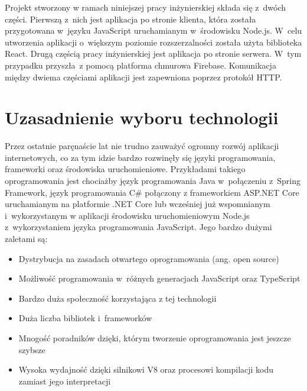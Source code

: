 \documentclass[../Kamil_Kowalewski_Main.tex]{subfiles}
\begin{document}
 {

    Projekt stworzony w ramach niniejszej pracy inżynierskiej składa się z~dwóch
    części. Pierwszą z~nich jest aplikacja po stronie klienta, która została
    przygotowana w~języku JavaScript\cite{website:javascript} uruchamianym w~środowisku
    Node.js\cite{website:nodejs}. W~celu utworzenia aplikacji o~większym poziomie
    rozszerzalności została użyta biblioteka React\cite{website:react}. Drugą częścią
    pracy inżynierskiej jest aplikacja po stronie serwera. W~tym przypadku przyszła~z
    pomocą platforma chmurowa Firebase\cite{website:firebase}. Komunikacja między
    dwiema częściami aplikacji jest zapewniona poprzez protokół HTTP\cite{website:http}.

    \section{Uzasadnienie wyboru technologii}
    \label{chapter3:technologie:uzasadnienie} {
        Przez ostatnie paręnaście lat nie trudno zauważyć ogromny rozwój
        aplikacji internetowych, co za tym idzie bardzo rozwinęły się języki
        programowania, frameworki oraz środowiska uruchomieniowe. Przykładami takiego
        oprogramowania jest chociażby język programowania Java\cite{website:java}
        w~połączeniu z~Spring Framework\cite{website:spring}, język programowania
        C\#\cite{website:csharp} połączony z frameworkiem ASP.NET Core\cite{website:aspnetcore}
        uruchamianym na platformie .NET Core\cite{website:netcoreplatform}
        lub wcześniej już wspomnianym i~wykorzystanym w aplikacji środowisku
        uruchomieniowym Node.js\cite{website:nodejs} z~wykorzystaniem języka programowania
        JavaScript\cite{website:javascript}.
        Jego bardzo dużymi zaletami są:
        \begin{itemize}
            \item Dystrybucja na zasadach otwartego oprogramowania (ang. open source)
            \item Możliwość programowania w~różnych generacjach JavaScript oraz
            TypeScript\cite{website:typescript}
            \item Bardzo duża społeczność korzystająca z tej technologii
            \item Duża liczba bibliotek i~frameworków
            \item Mnogość poradników dzięki, którym tworzenie oprogramowania jest
            jeszcze szybsze
            \item Wysoka wydajność dzięki silnikowi V8 oraz procesowi kompilacji kodu
            zamiast jego interpretacji
        \end{itemize}
    }

}
\end{document}
